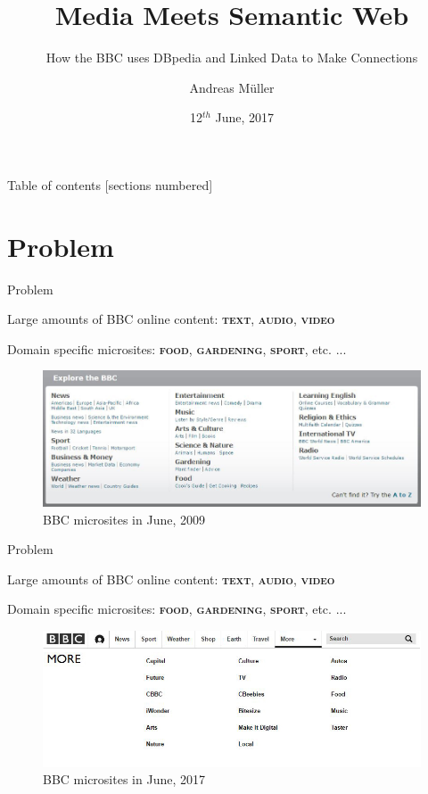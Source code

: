 \documentclass[10pt]{beamer}
\title{Media Meets Semantic Web}
\subtitle{How the BBC uses DBpedia and Linked Data to Make Connections}
\date{12$^{th}$ June, 2017}
\author{Andreas Müller}
\institute{Technische Universität Berlin}
\begin{document}
\maketitle

\begin{frame}{Table of contents}
  [sections numbered]
  \tableofcontents[hideallsubsections]
\end{frame}

\section{Problem}

\begin{frame}[fragile]{Problem}

  Large amounts of BBC online content: \textsc{\textbf{text}}, \textsc{\textbf{audio}}, \textsc{\textbf{video}}

  Domain specific microsites: \textsc{\textbf{food}}, \textsc{\textbf{gardening}}, \textsc{\textbf{sport}}, etc. ...

  \pause
  \begin{figure}
    \centering
      \includegraphics[width=\textwidth]{img/bbc_domains_2009}
    \caption{BBC microsites in June, 2009}
  \end{figure}

\end{frame}

\begin{frame}[fragile]{Problem}

  Large amounts of BBC online content: \textsc{\textbf{text}}, \textsc{\textbf{audio}}, \textsc{\textbf{video}}

  Domain specific microsites: \textsc{\textbf{food}}, \textsc{\textbf{gardening}}, \textsc{\textbf{sport}}, etc. ...

  \begin{figure}
    \centering
      \includegraphics[width=\textwidth]{img/bbc_domains_2017}
    \caption{BBC microsites in June, 2017}
  \end{figure}

\end{frame}
\end{document}
